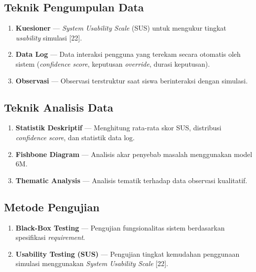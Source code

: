 \documentclass[10pt,twoside,openright]{report}
\begin{document}
\subsection{Teknik Pengumpulan Data}
\begin{enumerate}
    \item \textbf{Kuesioner} — \textit{System Usability Scale} (SUS) untuk mengukur tingkat \textit{usability} simulasi [22].
    \item \textbf{Data Log} — Data interaksi pengguna yang terekam secara otomatis oleh sistem (\textit{confidence score}, keputusan \textit{override}, durasi keputusan).
    \item \textbf{Observasi} — Observasi terstruktur saat siswa berinteraksi dengan simulasi.
\end{enumerate}

\subsection{Teknik Analisis Data}
\begin{enumerate}
    \item \textbf{Statistik Deskriptif} — Menghitung rata-rata skor SUS, distribusi \textit{confidence score}, dan statistik data log.
    \item \textbf{Fishbone Diagram} — Analisis akar penyebab masalah menggunakan model 6M.
    \item \textbf{Thematic Analysis} — Analisis tematik terhadap data observasi kualitatif.
\end{enumerate}

\subsection{Metode Pengujian}
\begin{enumerate}
    \item \textbf{Black-Box Testing} — Pengujian fungsionalitas sistem berdasarkan spesifikasi \textit{requirement}.
    \item \textbf{Usability Testing (SUS)} — Pengujian tingkat kemudahan penggunaan simulasi menggunakan \textit{System Usability Scale} [22].
\end{enumerate}
\end{document}
